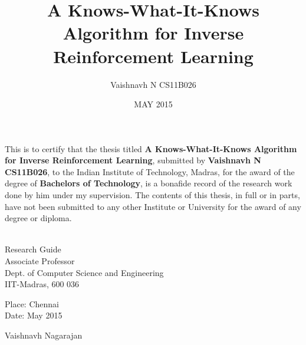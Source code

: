 \documentclass[BTech,thesis]{iitmdiss}
\def\thesistitle{A Knows-What-It-Knows Algorithm for Inverse Reinforcement Learning}
\def\thesisauthor{Vaishnavh N CS11B026}
\begin{document}
%

\title{\thesistitle}
\author{\thesisauthor}
\date{MAY 2015}
\maketitle

\certificate

\vspace*{0.5in}

\noindent This is to certify that the thesis titled {\bf {\thesistitle}}, submitted by {\bf {\thesisauthor}}, to the Indian Institute of Technology,
Madras, for the award of the degree of {\bf Bachelors of Technology}, is a bonafide record of the research work done by him under my
supervision. The contents of this thesis, in full or in parts, have not been submitted to any other Institute or University for the award of any
degree or diploma.

\vspace*{1in}
\hspace*{-0.25in}
\begin{singlespace}
\\
\noindent Research Guide\\ 
\noindent Associate Professor\\
\noindent Dept. of Computer Science and Engineering\\
\noindent IIT-Madras, 600 036 \\
\end{singlespace}
\vspace*{0.20in}
\noindent Place: Chennai\\ 
Date: May 2015


\acknowledgements



\hfill Vaishnavh Nagarajan



\begin{singlespace}
\tableofcontents
\thispagestyle{empty}



\listofalgorithms
{}

\end{singlespace}
\end{document}
